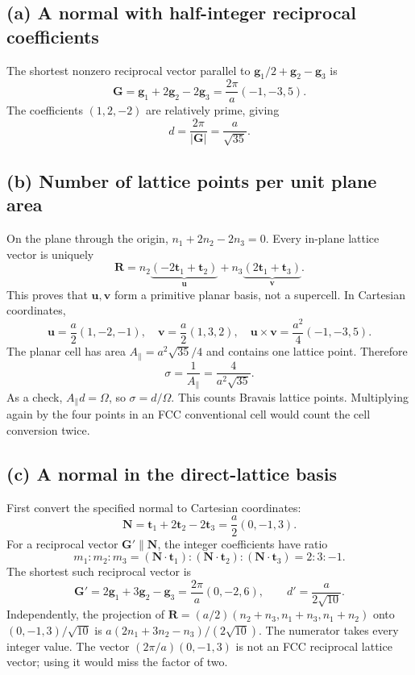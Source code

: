 \subsection*{(a) A normal with half-integer reciprocal coefficients}
The shortest nonzero reciprocal vector parallel to $\mathbf g_1/2+\mathbf g_2-\mathbf g_3$ is
\[
\mathbf G=\mathbf g_1+2\mathbf g_2-2\mathbf g_3
=\frac{2\pi}{a}(-1,-3,5).
\]
The coefficients $(1,2,-2)$ are relatively prime, giving
\[
\boxed{d=\frac{2\pi}{|\mathbf G|}=\frac{a}{\sqrt{35}}.}
\]

\subsection*{(b) Number of lattice points per unit plane area}
On the plane through the origin, $n_1+2n_2-2n_3=0$. Every in-plane lattice vector is uniquely
\[
\mathbf R=n_2\underbrace{(-2\mathbf t_1+\mathbf t_2)}_{\mathbf u}
+n_3\underbrace{(2\mathbf t_1+\mathbf t_3)}_{\mathbf v}.
\]
This proves that $\mathbf u,\mathbf v$ form a primitive planar basis, not a supercell. In Cartesian coordinates,
\[
\mathbf u=\frac a2(1,-2,-1),\quad
\mathbf v=\frac a2(1,3,2),\quad
\mathbf u\times\mathbf v=\frac{a^2}{4}(-1,-3,5).
\]
The planar cell has area $A_\parallel=a^2\sqrt{35}/4$ and contains one lattice point. Therefore
\[
\boxed{\sigma=\frac{1}{A_\parallel}=\frac{4}{a^2\sqrt{35}}.}
\]
As a check, $A_\parallel d=\Omega$, so $\sigma=d/\Omega$. This counts Bravais lattice points. Multiplying again by the four points in an FCC conventional cell would count the cell conversion twice.

\subsection*{(c) A normal in the direct-lattice basis}
First convert the specified normal to Cartesian coordinates:
\[
\mathbf N=\mathbf t_1+2\mathbf t_2-2\mathbf t_3=\frac a2(0,-1,3).
\]
For a reciprocal vector $\mathbf G'\parallel\mathbf N$, the integer coefficients have ratio
\[
m_1:m_2:m_3=(\mathbf N\cdot\mathbf t_1):
(\mathbf N\cdot\mathbf t_2):(\mathbf N\cdot\mathbf t_3)=2:3:-1.
\]
The shortest such reciprocal vector is
\[
\mathbf G'=2\mathbf g_1+3\mathbf g_2-\mathbf g_3
=\frac{2\pi}{a}(0,-2,6),\qquad
\boxed{d'=\frac{a}{2\sqrt{10}}.}
\]
Independently, the projection of
$\mathbf R=(a/2)(n_2+n_3,n_1+n_3,n_1+n_2)$
onto $(0,-1,3)/\sqrt{10}$ is
$a(2n_1+3n_2-n_3)/(2\sqrt{10})$.
The numerator takes every integer value. The vector $(2\pi/a)(0,-1,3)$ is not an FCC reciprocal lattice vector; using it would miss the factor of two.

